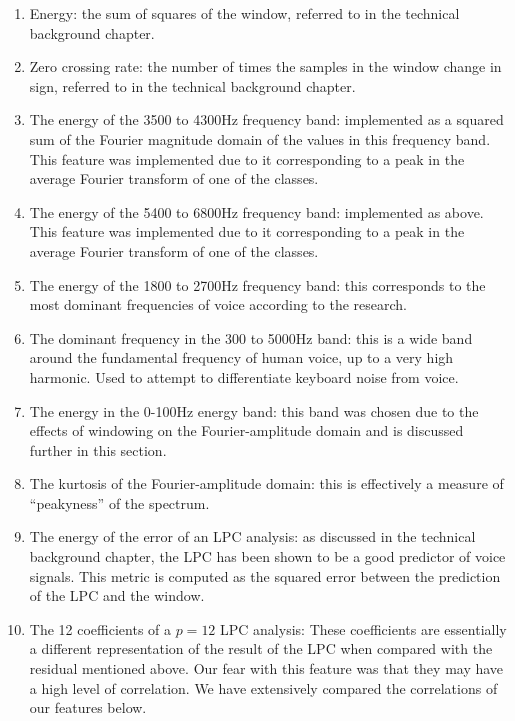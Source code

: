 \documentclass[ %
                    author={Sam Phippen},
                supervisor={Dr. Rafal Bogacz},
                     title={Real time voice activity detectors in noisy personal computing environments},
                  subtitle={},
                    degree={MEng},
                      year={2012} ]{thesis}
\begin{document}
\begin{enumerate}
    \item Energy: the sum of squares of the window, referred to in the technical
        background chapter.

    \item Zero crossing rate: the number of times the samples in the window
        change in sign, referred to in the technical background chapter.

    \item The energy of the 3500 to 4300Hz frequency band: implemented as a
        squared sum of the Fourier magnitude domain of the values in this
        frequency band. This feature was implemented due to it corresponding to
        a peak in the average Fourier transform of one of the classes.

    \item The energy of the 5400 to 6800Hz frequency band: implemented as
        above. This feature was implemented due to it corresponding to a peak
        in the average Fourier transform of one of the classes.

    \item The energy of the 1800 to 2700Hz frequency band: this corresponds to
        the most dominant frequencies of voice according to the research.

    \item The dominant frequency in the 300 to 5000Hz band: this is a wide band
        around the fundamental frequency of human voice, up to a very high
        harmonic. Used to attempt to differentiate keyboard noise from voice.

    \item The energy in the 0-100Hz energy band: this band was chosen due to
        the effects of windowing on the Fourier-amplitude domain and is
        discussed further in this section.

    \item The kurtosis of the Fourier-amplitude domain: this is effectively a
        measure of ``peakyness'' of the spectrum.

    \item The energy of the error of an LPC analysis: as discussed in the
        technical background chapter, the LPC has been shown to be a good
        predictor of voice signals. This metric is computed as the squared
        error between the prediction of the LPC and the window.

    \item The 12 coefficients of a $p=12$ LPC analysis: These coefficients
        are essentially a different representation of the result of the LPC
        when compared with the residual mentioned above. Our fear with this
        feature was that they may have a high level of correlation. We have
        extensively compared the correlations of our features below.


\end{enumerate}
\end{document}
